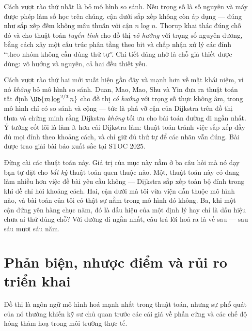 \documentclass[../../algorithm.tex]{subfiles}
\begin{document}
Cách vượt rào thứ nhất là bỏ mô hình so sánh. Nếu trọng số là số nguyên và máy được phép làm số học trên chúng, cận dưới sắp xếp không còn áp dụng --- đúng như sắp xếp đếm không mâu thuẫn với cận \(n\log n\). Thorup\cite{thorup1999} khai thác đúng chỗ đó và cho thuật toán \emph{tuyến tính}  cho đồ thị \emph{vô hướng} với trọng số nguyên dương, bằng cách xây một cấu trúc phân tầng theo bit và chấp nhận xử lý các đỉnh ``theo nhóm không cần đúng thứ tự''. Chi tiết đáng nhớ là chỗ giả thiết được dùng: vô hướng và nguyên, cả hai đều thiết yếu.

Cách vượt rào thứ hai mới xuất hiện gần đây và mạnh hơn về mặt khái niệm, vì nó \emph{không} bỏ mô hình so sánh. Duan, Mao, Mao, Shu và Yin\cite{duan2025} đưa ra thuật toán tất định \(\Ob{m\log^{2/3} n}\) cho đồ thị \emph{có hướng} với trọng số thực không âm, trong mô hình chỉ có so sánh và cộng --- tức là phá vỡ cận  của Dijkstra trên đồ thị thưa và chứng minh rằng Dijkstra \emph{không} tối ưu cho bài toán đường đi ngắn nhất. Ý tưởng cốt lõi là làm ít hơn cái Dijkstra làm: thuật toán tránh việc sắp xếp đầy đủ mọi đỉnh theo khoảng cách, và chỉ giữ đủ thứ tự để các nhãn vẫn đúng. Bài được trao giải bài báo xuất sắc tại STOC 2025.

Đừng cài các thuật toán này. Giá trị của mục này nằm ở ba câu hỏi mà nó dạy bạn tự đặt cho \emph{bất kỳ} thuật toán quen thuộc nào. Một, thuật toán này có đang làm nhiều hơn việc đề bài yêu cầu không --- Dijkstra sắp xếp toàn bộ đỉnh trong khi đề chỉ hỏi khoảng cách. Hai, cận dưới mà tôi vừa viện dẫn thuộc mô hình nào, và bài toán của tôi có thật sự nằm trong mô hình đó không. Ba, khi một cận đứng yên hàng chục năm, đó là dấu hiệu của một định lý hay chỉ là dấu hiệu chưa ai thử đúng chỗ? Với đường đi ngắn nhất, câu trả lời hoá ra là vế sau --- sau sáu mươi sáu năm.

\section{Phản biện, nhược điểm và rủi ro triển khai}

Đồ thị là ngôn ngữ mô hình hoá mạnh nhất trong thuật toán, nhưng sự phổ quát của nó thường khiến kỹ sư chủ quan trước các cái giá về phần cứng và các chế độ hỏng thảm hoạ trong môi trường thực tế.
\end{document}
